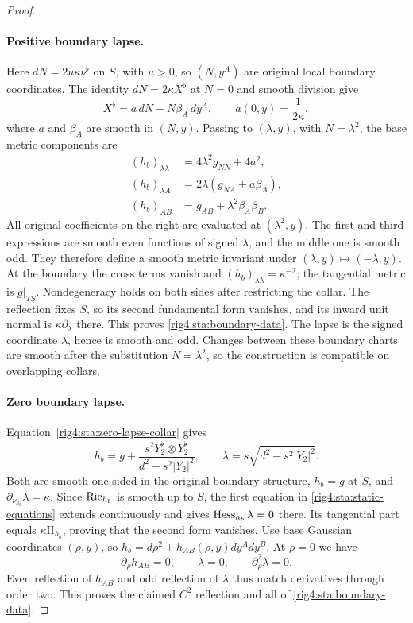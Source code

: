 \begin{proof}
\paragraph{Positive boundary lapse.}
Here $dN=2u\kappa\nu^\flat$ on $S$, with $u>0$, so $(N,y^A)$
are original local boundary coordinates. The identity
$dN=2\kappa X^\flat$ at $N=0$ and smooth division give
\[
 X^\flat=a\,dN+N\beta_A\,dy^A,
 \qquad a(0,y)=\frac1{2\kappa},
\]
where $a$ and $\beta_A$ are smooth in $(N,y)$. Passing to
$(\lambda,y)$, with $N=\lambda^2$, the base metric components are
\begin{equation}\label{rig4:sta:positive-lapse-base-collar}
 \begin{split}
 (h_b)_{\lambda\lambda}
       &=4\lambda^2g_{NN}+4a^2,\\
 (h_b)_{\lambda A}
       &=2\lambda(g_{NA}+a\beta_A),\\
 (h_b)_{AB}&=g_{AB}+\lambda^2\beta_A\beta_B.
 \end{split}
\end{equation}
All original coefficients on the right are evaluated at
$(\lambda^2,y)$. The first and third expressions are smooth even
functions of signed $\lambda$, and the middle one is smooth odd.
They therefore define a smooth metric invariant under
$(\lambda,y)\mapsto(-\lambda,y)$. At the boundary the cross terms
vanish and $(h_b)_{\lambda\lambda}=\kappa^{-2}$; the tangential
metric is $g|_{TS}$. Nondegeneracy holds on both sides after
restricting the collar. The reflection fixes $S$, so its second
fundamental form vanishes, and its inward unit normal is
$\kappa\partial_\lambda$ there. This proves
\eqref{rig4:sta:boundary-data}. The lapse is the signed coordinate
$\lambda$, hence is smooth and odd. Changes between these boundary
charts are smooth after the substitution $N=\lambda^2$, so the
construction is compatible on overlapping collars.

\paragraph{Zero boundary lapse.}
Equation~\eqref{rig4:sta:zero-lapse-collar} gives
\[
 h_b=g+
 \frac{s^2Y_2^\flat\otimes Y_2^\flat}{d^2-s^2|Y_2|^2},
 \qquad
 \lambda=s\sqrt{d^2-s^2|Y_2|^2}.
\]
Both are smooth one-sided in the original boundary structure,
$h_b=g$ at $S$, and $\partial_{\nu_{h_b}}\lambda=\kappa$.
Since $\operatorname{Ric}_{h_b}$ is smooth up to $S$, the first equation in
\eqref{rig4:sta:static-equations} extends continuously and gives
$\operatorname{Hess}_{h_b}\lambda=0$ there. Its tangential part equals
$\kappa\mathrm{II}_{h_b}$, proving that the second form vanishes.
Use base Gaussian coordinates $(\rho,y)$, so
$h_b=d\rho^2+h_{AB}(\rho,y)dy^A dy^B$. At $\rho=0$ we have
\[
 \partial_\rho h_{AB}=0,
 \qquad \lambda=0,
 \qquad \partial_\rho^2\lambda=0.
\]
Even reflection of $h_{AB}$ and odd reflection of $\lambda$ thus
match derivatives through order two. This proves the claimed $C^2$
reflection and all of \eqref{rig4:sta:boundary-data}.


\end{proof}
